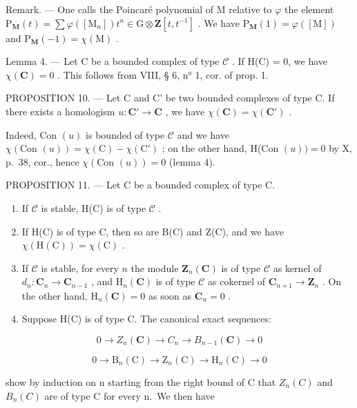 Remark. --- One calls the Poincaré polynomial of M relative to \(\varphi\) the element \(\mathrm{P}_{\mathbf{M}}(t) = \sum \varphi([\mathrm{M}_{n}]) t^{n} \in \mathrm{G} \otimes \mathbf{Z}[t, t^{-1}]\) . We have \(\mathrm{P}_{\mathbf{M}}(1) = \varphi([\mathrm{M}])\) and \(\mathrm{P}_{\mathbf{M}}(-1) = \chi(\mathrm{M})\) .

Lemma 4. --- Let C be a bounded complex of type \(\mathcal{C}\) . If H(C) = 0, we have \(\chi(\mathbf{C}) = 0\) . This follows from VIII, § 6, n° 1, cor. of prop. 1.

PROPOSITION 10. --- Let C and C' be two bounded complexes of type C. If there exists a homologism \(u: \mathbf{C}' \to \mathbf{C}\) , we have \(\chi(\mathbf{C}) = \chi(\mathbf{C}')\) .

Indeed, Con \((u)\) is bounded of type \(\mathcal{C}\) and we have \(\chi(\text{Con } (u)) = \chi(\text{C}) - \chi(\text{C}')\) ; on the other hand, H(Con \((u)) = 0\) by X, p.~38, cor., hence \(\chi(\text{Con } (u)) = 0\) (lemma 4).

PROPOSITION 11. --- Let C be a bounded complex of type C.

\begin{enumerate}
\def\labelenumi{\alph{enumi})}
\item
  If \(\mathcal{C}\) is stable, H(C) is of type \(\mathcal{C}\) .
\item
  If H(C) is of type C, then so are B(C) and Z(C), and we have \(\chi(\mathrm{H}(\mathrm{C})) = \chi(\mathrm{C})\) .
\item
  If \(\mathcal{C}\) is stable, for every \(n\) the module \(\mathbf{Z}_n(\mathbf{C})\) is of type \(\mathcal{C}\) as kernel of \(d_n: \mathbf{C}_n \to \mathbf{C}_{n-1}\) , and \(\mathrm{H}_n(\mathbf{C})\) is of type \(\mathcal{C}\) as cokernel of \(\mathbf{C}_{n+1} \to \mathbf{Z}_n\) . On the other hand, \(\mathrm{H}_n(\mathbf{C}) = 0\) as soon as \(\mathbf{C}_n = 0\) .
\item
  Suppose H(C) is of type C. The canonical exact sequences:
\end{enumerate}

\[
0 \to Z _ {n} (\mathbf {C}) \to C _ {n} \to B _ {n - 1} (\mathbf {C}) \to 0
\]

\[
0 \to \mathrm{B} _ {n} (\mathrm{C}) \to \mathrm{Z} _ {n} (\mathrm{C}) \to \mathrm{H} _ {n} (\mathrm{C}) \to 0
\]

show by induction on n starting from the right bound of C that \(Z_{n}(C)\) and \(B_{n}(C)\) are of type C for every n.~We then have

